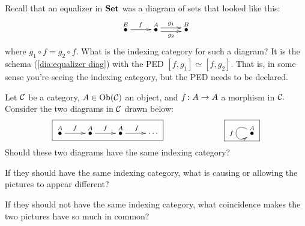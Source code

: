 \documentclass[CT4S-EN-RU]{subfiles}
\begin{document}
\begin{exerciseRUS}
\end{exerciseRUS}

\begin{exampleENG}
Recall that an equalizer in ${\mathbf{Set}}$ was a diagram of sets that looked like this:
\begin{align}\label{dia:equalizer diag}
\xymatrix{\LMO{E}\ar[r]^f&\LMO{A}\ar@<.5ex>[r]^{g_1}\ar@<-.5ex>[r]_{g_2}&\LMO{B}}
\end{align}
where $g_1\circ f=g_2\circ f.$ What is the indexing category for such a diagram? It is the schema (\ref{dia:equalizer diag}) with the PED $[f,g_1]\simeq[f,g_2].$ That is, in some sense you're seeing the indexing category, but the PED needs to be declared.
\end{exampleENG}

\begin{exampleRUS}
\end{exampleRUS}

\begin{exerciseENG}\label{exc:coincidence}
Let $\mathcal{C}$ be a category, $A\in\textnormal{Ob}(\mathcal{C})$ an object, and $f\colon A\rightarrow A$ a morphism in $\mathcal{C}.$ Consider the two diagrams in $\mathcal{C}$ drawn below:
$$\fbox{\xymatrix{\LMO{A}\ar[r]^f&\LMO{A}\ar[r]^f&\LMO{A}\ar[r]^f&\cdots}}\hspace{1in}\fbox{\xymatrix{\LMO{A}\ar@(ul,dl)[]_f}}$$
\sexc Should these two diagrams have the same indexing category?
\item If they should have the same indexing category, what is causing or allowing the pictures to appear different?
\item If they should not have the same indexing category, what coincidence makes the two pictures have so much in common?
\endsexc
\end{exerciseENG}

\begin{exerciseRUS}\label{exc:coincidence}
\end{exerciseRUS}
\end{document}
